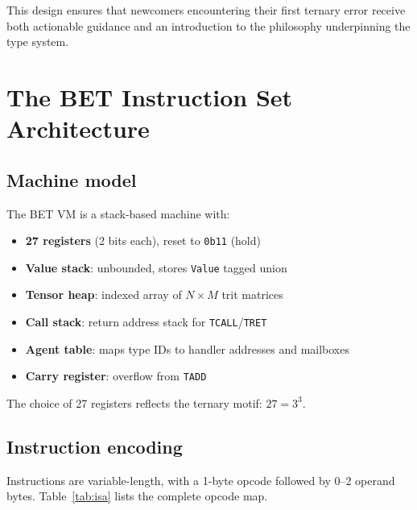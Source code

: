 \documentclass[11pt,a4paper]{article}
\begin{document}
This design ensures that newcomers encountering their first ternary error
receive both actionable guidance and an introduction to the philosophy
underpinning the type system.

\section{The BET Instruction Set Architecture}
\label{sec:isa}

\subsection{Machine model}

The BET VM is a stack-based machine with:

\begin{itemize}
  \item \textbf{27 registers} (2 bits each), reset to \texttt{0b11} (hold)
  \item \textbf{Value stack}: unbounded, stores \texttt{Value} tagged union
  \item \textbf{Tensor heap}: indexed array of $N \times M$ trit matrices
  \item \textbf{Call stack}: return address stack for \texttt{TCALL}/\texttt{TRET}
  \item \textbf{Agent table}: maps type IDs to handler addresses and mailboxes
  \item \textbf{Carry register}: overflow from \texttt{TADD}
\end{itemize}

The choice of 27 registers reflects the ternary motif: $27 = 3^3$.

\subsection{Instruction encoding}

Instructions are variable-length, with a 1-byte opcode followed by 0–2
operand bytes. Table~\ref{tab:isa} lists the complete opcode map.
\end{document}

